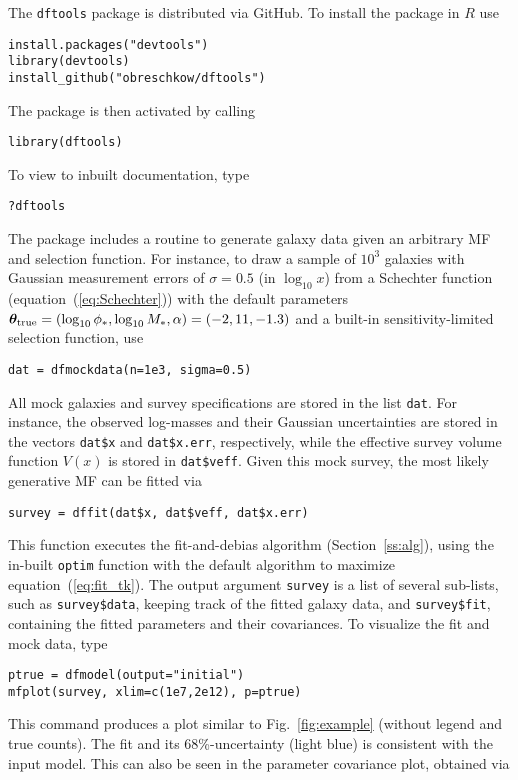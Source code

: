 \documentclass[a4paper,fleqn,usenatbib]{mnras}
\newcommand{\dftools}{\texttt{dftools}\xspace}
\newcommand{\veff}{V}%
\newcommand{\fig}[1]{Fig.~\ref{fig:#1}}
\newcommand{\eq}[1]{equation~(\ref{eq:#1})}
\renewcommand{\ss}[1]{Section~\ref{ss:#1}}
\newcommand{\para}{{\bm{\theta}}}
\begin{document}
The \dftools package is distributed via GitHub. To install the package in $R$ use
%
{\color{blue}\begin{lstlisting}
install.packages("devtools")
library(devtools)
install_github("obreschkow/dftools")
\end{lstlisting}}
%
\noindent The package is then activated by calling
%
{\color{blue}\begin{lstlisting}
library(dftools)
\end{lstlisting}}
%
\noindent To view to inbuilt documentation, type
%
{\color{blue}\begin{lstlisting}
?dftools
\end{lstlisting}}
%
The package includes a routine to generate galaxy data given an arbitrary MF and selection function. For instance, to draw a sample of $10^3$ galaxies with Gaussian measurement errors of $\sigma=0.5$ (in $\log_{10}x$) from a Schechter function (\eq{Schechter}) with the default parameters $\para_{\rm true}=(\log_{10}\phi_\ast,\log_{10}M_\ast,\alpha)=(-2,11,-1.3)$ and a built-in sensitivity-limited selection function, use
%
{\color{blue}\begin{lstlisting}
dat = dfmockdata(n=1e3, sigma=0.5)
\end{lstlisting}}
%
All mock galaxies and survey specifications are stored in the list \texttt{dat}. For instance, the observed log-masses and their Gaussian uncertainties are stored in the vectors \texttt{dat\$x} and \texttt{dat\$x.err}, respectively, while the effective survey volume function $\veff(x)$ is stored in \texttt{dat\$veff}. Given this mock survey, the most likely generative MF can be fitted via
%
{\color{blue}\begin{lstlisting}
survey = dffit(dat$x, dat$veff, dat$x.err)
\end{lstlisting}}
%
\noindent This function executes the fit-and-debias algorithm (\ss{alg}), using the in-built \texttt{optim} function with the default algorithm \citep{Nelder1965} to maximize \eq{fit_tk}. The output argument \texttt{survey} is a list of several sub-lists, such as \texttt{survey\$data}, keeping track of the fitted galaxy data, and \texttt{survey\$fit}, containing the fitted parameters and their covariances. To visualize the fit and mock data, type
%
{\color{blue}\begin{lstlisting}
ptrue = dfmodel(output="initial")
mfplot(survey, xlim=c(1e7,2e12), p=ptrue)
\end{lstlisting}}
%
\noindent This command produces a plot similar to \fig{example} (without legend and true counts). The fit and its 68\%-uncertainty (light blue) is consistent with the input model. This can also be seen in the parameter covariance plot, obtained via
\end{document}
